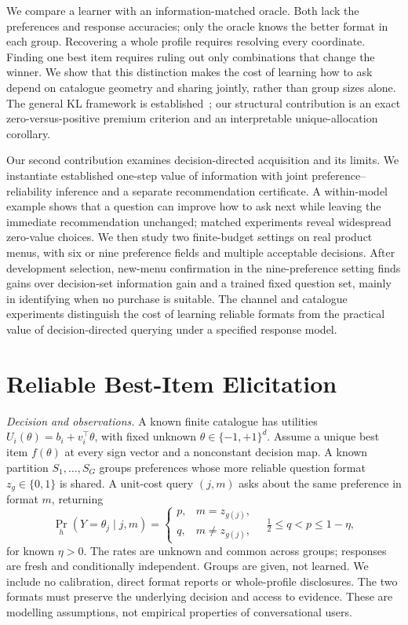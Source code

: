 \documentclass[sigconf,anonymous,review]{acmart}
\begin{document}
We compare a learner with an information-matched oracle. Both lack the preferences and response accuracies; only the oracle knows the better format in each group. Recovering a whole profile requires resolving every coordinate. Finding one best item requires ruling out only combinations that change the winner. We show that this distinction makes the cost of learning how to ask depend on catalogue geometry and sharing jointly, rather than group sizes alone. The general KL framework is established~\cite{r3,r5}; our structural contribution is an exact zero-versus-positive premium criterion and an interpretable unique-allocation corollary.
\par
Our second contribution examines decision-directed acquisition and its limits. We instantiate established one-step value of information \cite{r1} with joint preference--reliability inference and a separate recommendation certificate. A within-model example shows that a question can improve how to ask next while leaving the immediate recommendation unchanged; matched experiments reveal widespread zero-value choices. We then study two finite-budget settings on real product menus, with six or nine preference fields and multiple acceptable decisions. After development selection, new-menu confirmation in the nine-preference setting finds gains over decision-set information gain and a trained fixed question set, mainly in identifying when no purchase is suitable. The channel and catalogue experiments distinguish the cost of learning reliable formats from the practical value of decision-directed querying under a specified response model.
\section{Reliable Best-Item Elicitation}
\emph{Decision and observations.} A known finite catalogue has utilities $U_i(\theta)=b_i+v_i^\top\theta$, with fixed unknown $\theta\in\{-1,+1\}^d$. Assume a unique best item $f(\theta)$ at every sign vector and a nonconstant decision map. A known partition $S_1,\ldots,S_G$ groups preferences whose more reliable question format $z_g\in\{0,1\}$ is shared. A unit-cost query $(j,m)$ asks about the same preference in format $m$, returning
\begin{equation}\Pr_h(Y=\theta_j\mid j,m)=\begin{cases}p,&m=z_{g(j)},\\q,&m\ne z_{g(j)},\end{cases}\quad \tfrac12\le q<p\le1-\eta,\end{equation}
for known $\eta>0$. The rates are unknown and common across groups; responses are fresh and conditionally independent. Groups are given, not learned. We include no calibration, direct format reports or whole-profile disclosures. The two formats must preserve the underlying decision and access to evidence. These are modelling assumptions, not empirical properties of conversational users.
\end{document}
